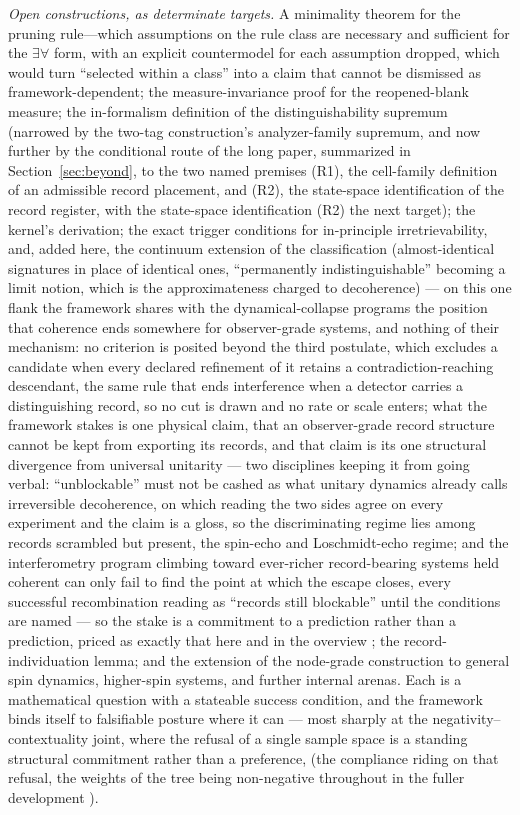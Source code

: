 \emph{Open constructions, as determinate targets.} A minimality theorem for the pruning rule---which assumptions on the rule class are necessary and sufficient for the $\exists\forall$ form, with an explicit countermodel for each assumption dropped, which would turn ``selected within a class'' into a claim that cannot be dismissed as framework-dependent; the measure-invariance proof for the reopened-blank measure; the in-formalism definition of the distinguishability supremum (narrowed by the two-tag construction's analyzer-family supremum, and now further by the conditional route of the long paper, summarized in Section~\ref{sec:beyond}, to the two named premises (R1), the cell-family definition of an admissible record placement, and (R2), the state-space identification of the record register, with the state-space identification (R2) the next target); the kernel's derivation; the exact trigger conditions for in-principle irretrievability, and, added here, the continuum extension of the classification (almost-identical signatures in place of identical ones, ``permanently indistinguishable'' becoming a limit notion, which is the approximateness charged to decoherence) --- on this one flank the framework shares with the dynamical-collapse programs the position that coherence ends somewhere for observer-grade systems, and nothing of their mechanism: no criterion is posited beyond the third postulate, which excludes a candidate when every declared refinement of it retains a contradiction-reaching descendant, the same rule that ends interference when a detector carries a distinguishing record, so no cut is drawn and no rate or scale enters; what the framework stakes is one physical claim, that an observer-grade record structure cannot be kept from exporting its records, and that claim is its one structural divergence from universal unitarity --- two disciplines keeping it from going verbal: ``unblockable'' must not be cashed as what unitary dynamics already calls irreversible decoherence, on which reading the two sides agree on every experiment and the claim is a gloss, so the discriminating regime lies among records scrambled but present, the spin-echo and Loschmidt-echo regime; and the interferometry program climbing toward ever-richer record-bearing systems held coherent can only fail to find the point at which the escape closes, every successful recombination reading as ``records still blockable'' until the conditions are named --- so the stake is a commitment to a prediction rather than a prediction, priced as exactly that here and in the overview \cite{AethusBrief}; the record-individuation lemma; and the extension of the node-grade construction to general spin dynamics, higher-spin systems, and further internal arenas. Each is a mathematical question with a stateable success condition, and the framework binds itself to falsifiable posture where it can --- most sharply at the negativity--contextuality joint, where the refusal of a single sample space is a standing structural commitment rather than a preference, (the compliance riding on that refusal, the weights of the tree being non-negative throughout in the fuller development \cite{Aethus}).
